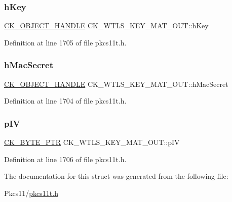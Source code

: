 \subsubsection{\texorpdfstring{h\+Key}{hKey}}
{\footnotesize\ttfamily \hyperlink{pkcs11t_8h_ad1cdd703196214cd34e6f9f52bc67683}{C\+K\+\_\+\+O\+B\+J\+E\+C\+T\+\_\+\+H\+A\+N\+D\+LE} C\+K\+\_\+\+W\+T\+L\+S\+\_\+\+K\+E\+Y\+\_\+\+M\+A\+T\+\_\+\+O\+U\+T\+::h\+Key}



Definition at line 1705 of file pkcs11t.\+h.

\mbox{\label{struct_c_k___w_t_l_s___k_e_y___m_a_t___o_u_t_a00658d76a389d170699973832566b3a3}} 
\subsubsection{\texorpdfstring{h\+Mac\+Secret}{hMacSecret}}
{\footnotesize\ttfamily \hyperlink{pkcs11t_8h_ad1cdd703196214cd34e6f9f52bc67683}{C\+K\+\_\+\+O\+B\+J\+E\+C\+T\+\_\+\+H\+A\+N\+D\+LE} C\+K\+\_\+\+W\+T\+L\+S\+\_\+\+K\+E\+Y\+\_\+\+M\+A\+T\+\_\+\+O\+U\+T\+::h\+Mac\+Secret}



Definition at line 1704 of file pkcs11t.\+h.

\mbox{\label{struct_c_k___w_t_l_s___k_e_y___m_a_t___o_u_t_a3bd65cceda3c251a13277ac4aef20d07}} 
\subsubsection{\texorpdfstring{p\+IV}{pIV}}
{\footnotesize\ttfamily \hyperlink{pkcs11t_8h_a3d7233a4077fbaf7ae76b64da0a62a21}{C\+K\+\_\+\+B\+Y\+T\+E\+\_\+\+P\+TR} C\+K\+\_\+\+W\+T\+L\+S\+\_\+\+K\+E\+Y\+\_\+\+M\+A\+T\+\_\+\+O\+U\+T\+::p\+IV}



Definition at line 1706 of file pkcs11t.\+h.



The documentation for this struct was generated from the following file\+:\begin{DoxyCompactItemize}
\item 
Pkcs11/\hyperlink{pkcs11t_8h}{pkcs11t.\+h}\end{DoxyCompactItemize}
